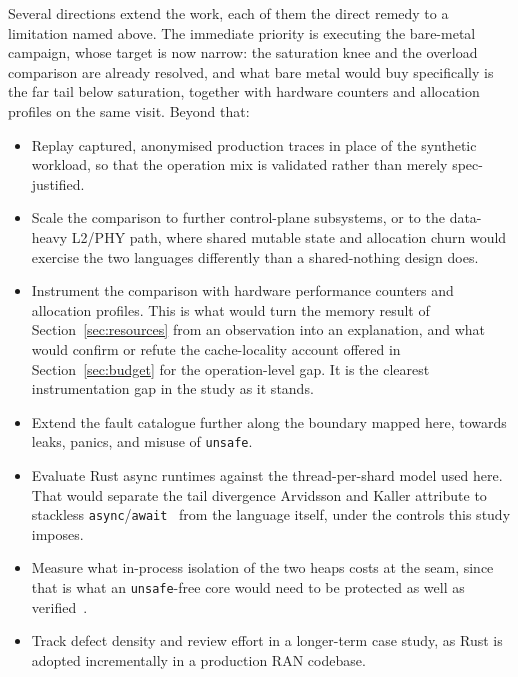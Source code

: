 \documentclass[english,twoside,openright,a4paper,censored,csm,software-track-2020]{HYthesisML}
\begin{document}
Several directions extend the work, each of them the direct remedy to a limitation named above.
The immediate priority is executing the bare-metal campaign, whose target is now narrow: the
saturation knee and the overload comparison are already resolved, and what bare metal would buy
specifically is the far tail below saturation, together with hardware counters and allocation
profiles on the same visit. Beyond that:

\begin{itemize}
\item Replay captured, anonymised production traces in place of the synthetic workload, so that
  the operation mix is validated rather than merely spec-justified.
\item Scale the comparison to further control-plane subsystems, or to the data-heavy L2/PHY
  path, where shared mutable state and allocation churn would exercise the two languages
  differently than a shared-nothing design does.
\item Instrument the comparison with hardware performance counters and allocation profiles. This
  is what would turn the memory result of Section~\ref{sec:resources} from an observation into
  an explanation, and what would confirm or refute the cache-locality account offered in
  Section~\ref{sec:budget} for the operation-level gap. It is the clearest instrumentation gap
  in the study as it stands.
\item Extend the fault catalogue further along the boundary mapped here, towards leaks, panics,
  and misuse of \texttt{unsafe}.
\item Evaluate Rust async runtimes against the thread-per-shard model used here. That would
  separate the tail divergence Arvidsson and Kaller attribute to stackless
  \texttt{async}/\texttt{await}~\cite{arvidsson2025async} from the language itself, under the
  controls this study imposes.
\item Measure what in-process isolation of the two heaps costs at the seam, since that is what
  an \texttt{unsafe}-free core would need to be protected as well as
  verified~\cite{rivera2021galeed,kirth2022pkrusafe}.
\item Track defect density and review effort in a longer-term case study, as Rust is adopted
  incrementally in a production RAN codebase.
\end{itemize}

\end{document}
